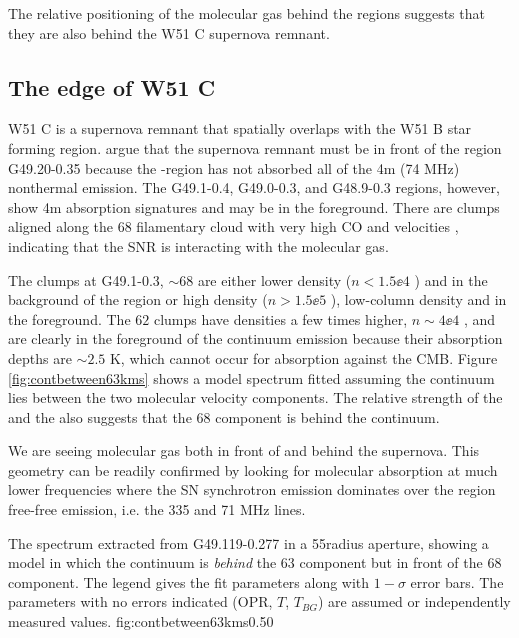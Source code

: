 The relative positioning of the molecular gas behind the \hii regions suggests
that they are also behind the W51 C supernova remnant.

\subsection{The edge of W51 C}
W51 C is a supernova remnant that spatially overlaps with the W51 B star
forming region.  \citet{Brogan2013a} argue that the supernova remnant must be
in front of the \hii region G49.20-0.35 because the \hii-region has not absorbed
all of the 4m (74 MHz) nonthermal emission.  The G49.1-0.4, G49.0-0.3, and G48.9-0.3
regions, however, show 4m absorption signatures and may be in the foreground.
There are clumps aligned along the 68 \kms filamentary cloud with very high CO
and \hi velocities \citep{Koo1997b,Koo1997c,Brogan2013a}, indicating that the
SNR is interacting with the molecular gas.

The clumps at G49.1-0.3, $\sim68$ \kms are either lower density ($n<1.5\ee{4}$
\percc) and in the background of the \hii region or high density ($n>1.5\ee{5}$
\percc), low-column density and in the foreground.  The $62$ \kms clumps have
densities a few times higher, $n\sim4\ee{4}$ \percc, and are clearly in the
foreground of the continuum emission because their absorption depths are
$\sim2.5$ K, which cannot occur for absorption against the CMB.  Figure
\ref{fig:contbetween63kms} shows a model spectrum fitted assuming the continuum
lies between the two molecular velocity components.  The relative strength of
the \thirteenco and the \formaldehyde also suggests that the 68 \kms component
is behind the continuum.

We are seeing molecular gas both in front of and behind the supernova.  This
geometry can be readily confirmed by looking for molecular absorption at much
lower frequencies where the SN synchrotron emission dominates over the \hii
region free-free emission, i.e. the 335 and 71 MHz \para lines.

{The spectrum extracted from G49.119-0.277 in a 55\arcsec radius aperture,
showing a model in which the continuum is \emph{behind} the 63 \kms component
but in front of the 68 \kms component.  The legend gives the fit parameters
along with $1-\sigma$ error bars.  The parameters with no errors indicated
(OPR, $T$, $T_{BG}$) are assumed or independently measured values.}
{fig:contbetween63kms}{0.5}{0}

